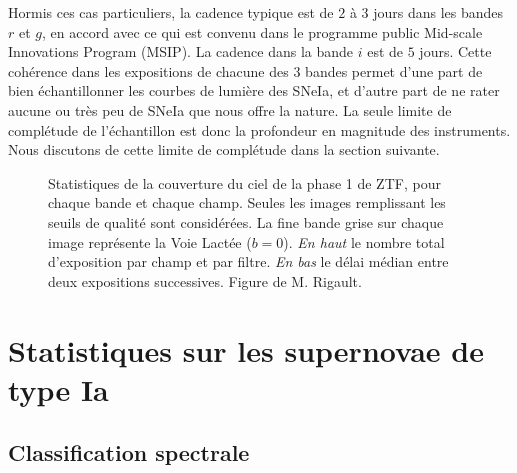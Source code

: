 \documentclass[../main/main.tex]{subfiles}
\begin{document}
Hormis ces cas particuliers, la cadence typique est de $2$ à $3$ jours
dans les bandes $r$ et $g$, en accord avec ce qui est convenu dans le
programme public Mid-scale Innovations Program (MSIP). La cadence dans
la bande $i$ est de $5$ jours. Cette cohérence dans les expositions de
chacune des $3$ bandes permet d'une part de bien échantillonner les courbes de
lumière des SNeIa, et d'autre part de ne rater aucune ou très peu de
SNeIa que nous offre la nature. La seule limite de complétude de
l'échantillon est donc la profondeur en magnitude des instruments. Nous
discutons de cette limite de complétude dans la section suivante.

\begin{figure}[ht]
  \centering
  \caption[Statistiques de la couverture du ciel de la phase 1 de
  ZTF.]{Statistiques de la couverture du ciel de la phase 1 de ZTF, pour
    chaque bande et chaque champ. Seules les images remplissant les
    seuils de qualité sont considérées. La fine bande grise sur
    chaque image représente la Voie Lactée ($b=0$). \emph{En haut} le nombre total d'exposition par champ et par
    filtre. \emph{En bas} le délai médian entre deux
    expositions successives. Figure de M. Rigault.}
  \label{fig:skycoverage}
\end{figure}

\section{Statistiques sur les supernovae de type Ia}

\subsection{Classification spectrale}
\end{document}
